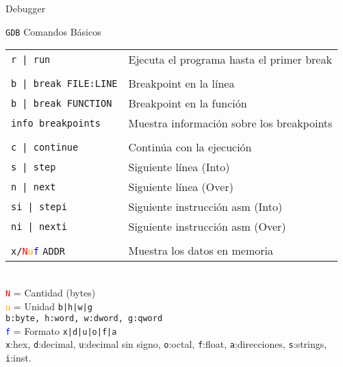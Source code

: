\documentclass[aspectratio=169]{beamer}
\begin{document}
\begin{frame}[plain]
    \begin{center}
    \Huge Debugger
    \end{center}
\end{frame}

\begin{frame}[fragile]{\texttt{GDB}}
    Comandos Básicos\\
    \vspace{0.2cm}
    \small
    \begin{tabular}{ll}
    \verb;r | run;             & Ejecuta el programa hasta el primer break\\
    & \\
    \verb;b | break FILE:LINE; & Breakpoint en la línea\\
    \verb;b | break FUNCTION;  & Breakpoint en la función\\
    \verb;info breakpoints;    & Muestra información sobre los breakpoints\\
    & \\
    \verb;c | continue;        & Continúa con la ejecución\\
    \verb;s | step;            & Siguiente línea (Into)\\
    \verb;n | next;            & Siguiente línea (Over)\\
    \verb;si | stepi;          & Siguiente instrucción asm (Into)\\
    \verb;ni | nexti;          & Siguiente instrucción asm (Over)\\
    & \\
    \verb;x/;\textcolor{red}{\texttt{N}}\textcolor{orange}{\texttt{u}}\textcolor{blue}{\texttt{f}} \verb;ADDR;          & Muestra los datos en memoria\\ %
    \end{tabular}\\
    \scriptsize
    \hspace{.55cm} \textcolor{red}{\texttt{N}} = Cantidad (bytes)\\
    \hspace{.55cm} \textcolor{orange}{\texttt{u}} = Unidad \verb;b|h|w|g;\\
    \hspace{.55cm} \hspace{0.37cm} \verb;b:byte, h:word, w:dword, g:qword;\\
    \hspace{.55cm} \textcolor{blue}{\texttt{f}} = Formato \verb;x|d|u|o|f|a;\\
    \hspace{.55cm} \hspace{0.37cm} \verb;x;:hex, \verb;d;:decimal, \verb;u;:decimal sin signo, \verb;o;:octal, \verb;f;:float, \verb;a;:direcciones, \verb;s;:strings, \verb;i;:inst.\\
\end{frame}
\end{document}
